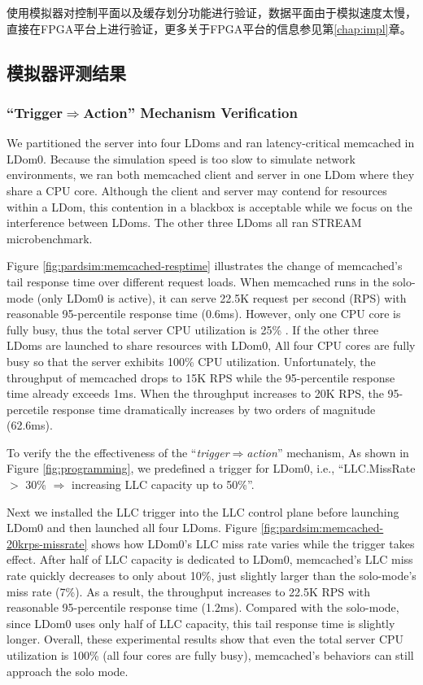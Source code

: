 使用模拟器对控制平面以及缓存划分功能进行验证，数据平面由于模拟速度太慢，直接在FPGA平台上进行验证，更多关于FPGA平台的信息参见第\ref{chap:impl}章。


\subsection{模拟器评测结果}

\subsubsection{``Trigger$\Rightarrow$Action'' Mechanism Verification}\leavevmode

We partitioned the server into four LDoms and ran latency-critical memcached
in LDom0. Because the simulation speed is too slow to simulate
network environments, we ran both memcached
client and server in one LDom where they share a CPU core. Although
the client and server may contend for resources within a LDom, this contention
in a blackbox is acceptable while we focus on the interference between LDoms.
The other three LDoms all ran STREAM microbenchmark.

Figure \ref{fig:pardsim:memcached-resptime} illustrates the change of
memcached's tail response time over different request loads.
When memcached runs in the solo-mode (only LDom0 is active),
it can serve 22.5K request per
second (RPS) with reasonable 95-percentile response time (0.6ms). However,
only one CPU core is fully busy, thus the total server CPU utilization is 25\% .
If the other three LDoms are launched to share resources with LDom0,
All four CPU cores are fully busy so that the server exhibits 100\% CPU utilization.
Unfortunately, the throughput of memcached drops to 15K RPS while
the 95-percentile response time already exceeds 1ms. When 
the throughput increases to 20K RPS, the 95-percetile response time
dramatically increases by two orders of magnitude (62.6ms). 

To verify the the effectiveness of the ``\emph{trigger$\Rightarrow$action}'' mechanism,
As shown in Figure \ref{fig:programming}, we predefined a trigger for LDom0, i.e.,
``LLC.MissRate $>$ 30\% $\Rightarrow$ increasing LLC capacity up to 50\%''.

Next we installed the LLC trigger into the LLC control plane before launching
LDom0 and then launched all four LDoms. Figure \ref{fig:pardsim:memcached-20krps-missrate} shows how
LDom0's LLC miss rate varies while the trigger takes effect. After half of LLC capacity is
dedicated to LDom0, memcached's LLC miss rate quickly decreases to
only about 10\%, just slightly larger than the solo-mode's miss rate (7\%).
As a result, the throughput increases to 22.5K RPS with reasonable
95-percentile response time (1.2ms). Compared with the solo-mode, 
since LDom0 uses only half of LLC capacity, this tail response time is 
slightly longer. Overall, these experimental results show that even the total 
server CPU utilization is 100\% (all four cores are fully busy),
memcached's behaviors can still approach the solo mode.

